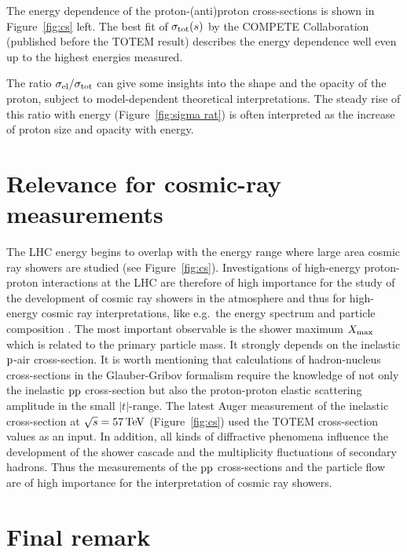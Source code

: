 \documentclass[doublecol]{epl/epl2}
\def\un#1{\,{\rm #1}}
\begin{document}
The energy dependence of the proton-(anti)proton cross-sections is shown in Figure~\ref{fig:cs} left. The best fit of $\sigma_{\rm tot}(s)$ by the COMPETE Collaboration \cite{compete} (published before the TOTEM result) describes the energy dependence well even up to the highest energies measured.  

The ratio $\sigma_{\rm el}/\sigma_{\rm tot}$ can give some insights into the shape and the opacity of the proton, subject to model-dependent theoretical interpretations. The steady rise of this ratio with energy (Figure~\ref{fig:sigma rat}) is often interpreted as the increase of proton size and opacity with energy. 

\FigRatio

\section{Relevance for cosmic-ray measurements}

The LHC energy begins to overlap with the energy range where large area cosmic ray showers are studied (see Figure~\ref{fig:cs}). Investigations of high-energy proton-proton interactions at the LHC are therefore of high importance for the study of the development of cosmic ray showers in the atmosphere and thus for high-energy cosmic ray interpretations, like e.g.~the energy spectrum and particle composition \cite{enterria}.  The most important observable is the shower maximum $X_{\rm max}$ which is related to the primary particle mass. It strongly depends on the inelastic $\rm p$-air cross-section. It is worth mentioning that calculations of hadron-nucleus cross-sections in the Glauber-Gribov formalism \cite{nagano,glauber} require the knowledge of not only the inelastic $\rm pp$ cross-section but also the proton-proton elastic scattering amplitude in the small $|t|$-range. The latest Auger measurement of the inelastic cross-section at $\sqrt s = 57\un{TeV}$ \cite{auger} (Figure~\ref{fig:cs}) used the TOTEM cross-section values as an input. In addition, all kinds of diffractive phenomena influence the development of the shower cascade and the multiplicity fluctuations of secondary hadrons. Thus the measurements of the $\rm pp$ cross-sections and the particle flow are of high importance for the interpretation of cosmic ray showers.

\section{Final remark}
\end{document}
